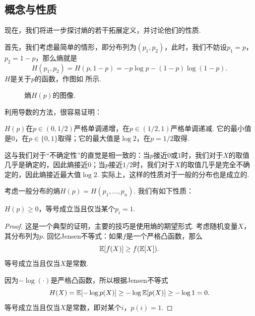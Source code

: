 \subsection{概念与性质}
现在，我们将进一步探讨熵的若干拓展定义，并讨论他们的性质. 

首先，我们考虑最简单的情形，即分布列为$(p_1,p_2)$，此时，我们不妨设$p_1=p$，$p_2=1-p$，那么熵就是
    \[H(p_1,p_2)=H(p,1-p)=-p\log p-(1-p)\log(1-p).\]
$H$是关于$p$的函数，作图如 所示.
\begin{figure}[ht]
        \centering
        
        \caption{熵$H(p)$的图像.}
        \label{fig:entropy-figure}
\end{figure}

利用导数的方法，很容易证明：
\begin{proposition}\label{prop:entropy-2prob}
    $H(p)$在$p\in (0,1/2)$严格单调递增，在$p\in (1/2,1)$严格单调递减. 它的最小值是$0$，在$p\in\{0,1\}$取得；它的最大值是$\log 2$，在$p=1/2$取得.    
\end{proposition}

 这与我们对于“不确定性”的直觉是相一致的：当$p$接近$0$或$1$时，我们对于$X$的取值几乎是确定的，因此熵接近$0$；当$p$接近$1/2$时，我们对于$X$的取值几乎是完全不确定的，因此熵接近最大值$\log 2$. 实际上，这样的性质对于一般的分布也是成立的.

考虑一般分布的熵$H(p)=H(p_1,\dots,p_n)$. 我们有如下性质：
\begin{proposition}\label{prop:entropy-nonnegative}
    $H(p)\geq 0$，等号成立当且仅当某个$p_i=1$.
\end{proposition}
\begin{proof}
这是一个典型的证明，主要的技巧是使用熵的期望形式. 考虑随机变量$X$，其分布列为$p$. 回忆Jensen不等式：如果$f$是一个严格凸函数，那么
\[\mathbb{E}[f(X)]\geq f(\mathbb{E}[X]).\]
等号成立当且仅当$X$是常数.

因为$-\log(\cdot)$是严格凸函数，所以根据Jensen不等式
\[H(X)=\mathbb{E}[-\log p(X)]\geq-\log\mathbb{E}[p(X)]\geq -\log 1=0.\]
等号成立当且仅当$X$是常数，即对某个$i$，$p(i)=1$.
\end{proof}

